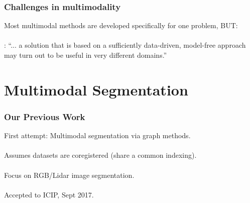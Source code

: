 \documentclass{beamer}
\begin{document}

\begin{frame}
  \frametitle{Challenges in multimodality}
  Most multimodal methods are developed specifically for one problem, BUT: \\~\\
  \cite{Lahat2015}: ``... a solution that is based on a sufficiently data-driven, model-free approach may turn out to be useful in very different domains.''
\end{frame}


\section{Multimodal Segmentation}
\begin{frame}
  \frametitle{Our Previous Work}
  First attempt: Multimodal segmentation via graph methods.
  \\~\\
  Assumes datasets are coregistered (share a common indexing).
  \\~\\
  Focus on RGB/Lidar image segmentation.
  \\~\\
  Accepted to ICIP, Sept 2017.
\end{frame}

\end{document}
